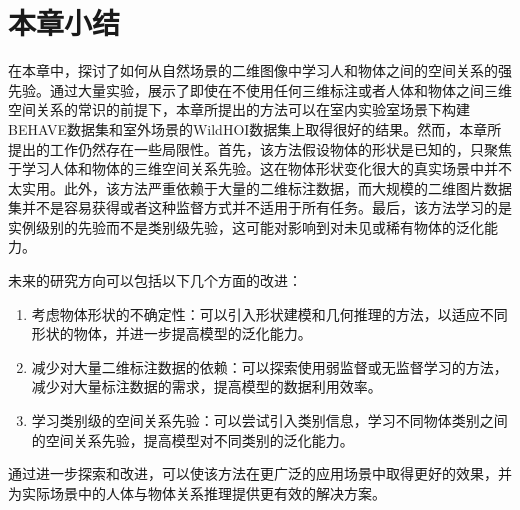 \section{本章小结}
在本章中，探讨了如何从自然场景的二维图像中学习人和物体之间的空间关系的强先验。通过大量实验，展示了即使在不使用任何三维标注或者人体和物体之间三维空间关系的常识的前提下，本章所提出的方法可以在室内实验室场景下构建BEHAVE数据集和室外场景的WildHOI数据集上取得很好的结果。然而，本章所提出的工作仍然存在一些局限性。首先，该方法假设物体的形状是已知的，只聚焦于学习人体和物体的三维空间关系先验。这在物体形状变化很大的真实场景中并不太实用。此外，该方法严重依赖于大量的二维标注数据，而大规模的二维图片数据集并不是容易获得或者这种监督方式并不适用于所有任务。最后，该方法学习的是实例级别的先验而不是类别级先验，这可能对影响到对未见或稀有物体的泛化能力。

未来的研究方向可以包括以下几个方面的改进：
\begin{enumerate}
	\item 考虑物体形状的不确定性：可以引入形状建模和几何推理的方法，以适应不同形状的物体，并进一步提高模型的泛化能力。
	\item 减少对大量二维标注数据的依赖：可以探索使用弱监督或无监督学习的方法，减少对大量标注数据的需求，提高模型的数据利用效率。
	\item 学习类别级的空间关系先验：可以尝试引入类别信息，学习不同物体类别之间的空间关系先验，提高模型对不同类别的泛化能力。
\end{enumerate}

通过进一步探索和改进，可以使该方法在更广泛的应用场景中取得更好的效果，并为实际场景中的人体与物体关系推理提供更有效的解决方案。